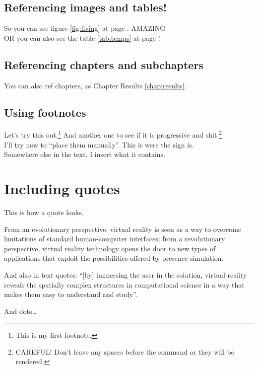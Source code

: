 
\subsection{Referencing images and tables!}
So you can see figure \ref{fig:living} at page \pageref{fig:living}. AMAZING\\
OR you can also see the table \ref{tab:temps} at page \pageref{tab:temps}!

\subsection{Referencing chapters and subchapters}
You can also ref chapters, as Chapter Results \ref{chap:results}.

\subsection{Using footnotes}
Let's try this out.\footnote{This is my first footnote.} And another one to see if it is progressive and shit.\footnote{CAREFUL! Don't leave any spaces before the command or they will be rendered.}\\

I'll try now to ``place them manually''. This is were the sign is.\footnotemark \\
Somewhere else in the text. I insert what it contains.

\section{Including quotes}
This is how a quote looks. 

\begin{displayquote}
	From an evolutionary perspective, virtual reality is seen as a way to overcome limitations of standard human-computer interfaces; from a revolutionary perspective, virtual reality technology opens the door to new types of applications that exploit the possibilities offered by presence simulation.
\end{displayquote}

And also in text quotes: \enquote{[by] immersing the user in the solution, virtual reality reveals the spatially complex structures in computational science in a way that makes them easy to understand and study}.

And dots\dots

